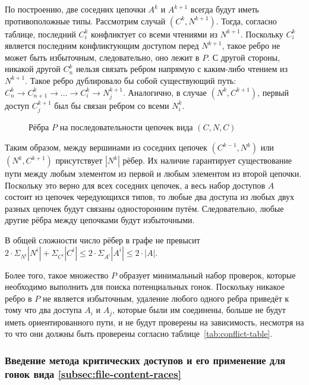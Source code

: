 По построению, две соседних цепочки $A^k$ и $A^{k+1}$ всегда будут иметь противоположные типы. Рассмотрим случай $(C^k, N^{k+1})$. Тогда, согласно таблице, последний $C^k_i$ конфликтует со всеми чтениями из $N^{k+1}$. Поскольку $C^k_i$ является последним конфликтующим доступом перед $N^{k+1}$, такое ребро не может быть избыточным, следовательно, оно лежит в $P$. С другой стороны, никакой другой $C^k_n$ нельзя связать ребром напрямую с каким-либо чтением из $N^{k+1}$. Такое ребро дублировало бы собой существующий путь: $C^k_n \rightarrow C^k_{n+1} \rightarrow \ldots \rightarrow C^k_i \rightarrow N^{k+1}_j$. Аналогично, в случае $(N^k, C^{k+1})$, первый доступ $C^{k+1}_j$ был бы связан ребром со всеми $N^k_i$.

\begin{figure}[H]
    \centering
    
    \caption{Рёбра $P$ на последовательности цепочек вида $(C, N, C)$}
    \label{fig:cnc-edges}
\end{figure}

Таким образом, между вершинами из соседних цепочек $(C^{k-1}, N^k)$ или $(N^k, C^{k+1})$ присутствует $|N^k|$ рёбер. Их наличие гарантирует существование пути между любым элементом из первой и любым элементом из второй цепочки. Поскольку это верно для всех соседних цепочек, а весь набор доступов $A$ состоит из цепочек чередующихся типов, то любые два доступа из любых двух разных цепочек будут связаны односторонним путём. Следовательно, любые другие рёбра между цепочками будут избыточными.

В общей сложности число рёбер в графе не превысит $2 \cdot \Sigma_{N^i} |N^i| + \Sigma_{C^i} |C^i| \leq 2 \cdot \Sigma_{A^i} |A^i| \leq 2 \cdot |A|$.

Более того, такое множество $P$ образует минимальный набор проверок, которые необходимо выполнить для поиска потенциальных гонок. Поскольку никакое ребро в $P$ не является избыточным, удаление любого одного ребра приведёт к тому что два доступа $A_i$ и $A_j$, которые были им соединены, больше не будут иметь ориентированного пути, и не будут проверены на зависимость, несмотря на то что они должны быть проверены согласно таблице~\ref{tab:conflict-table}.

\subsubsection{Введение метода критических доступов и его применение для гонок вида \ref{subsec:file-content-races}}


